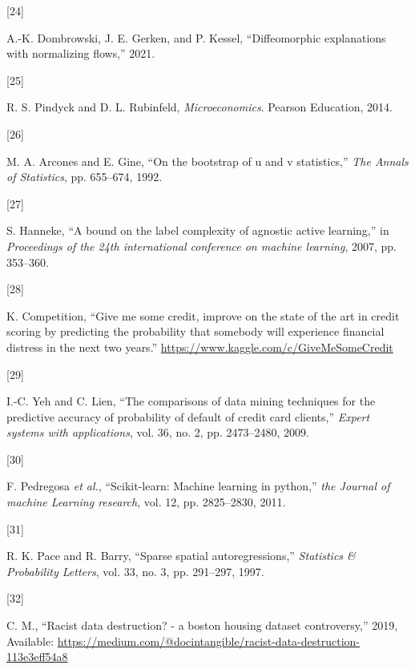 \documentclass[
  conference]{IEEEtran}
\newlength{\cslhangindent}
\newlength{\csllabelwidth}
\newlength{\cslentryspacingunit} %
\newenvironment{CSLReferences}[2] %
 {%
  \setlength{\parindent}{0pt}
  \ifodd #1
  \let\oldpar\par
  \def\par{\hangindent=\cslhangindent\oldpar}
  \fi
  \setlength{\parskip}{#2\cslentryspacingunit}
 }%
 {}
\newcommand{\CSLLeftMargin}[1]{\parbox[t]{\csllabelwidth}{#1}}
\newcommand{\CSLRightInline}[1]{\parbox[t]{\linewidth - \csllabelwidth}{#1}\break}
\begin{document}
\begin{CSLReferences}{0}{0}
\leavevmode{}%
\CSLLeftMargin{{[}24{]} }%
\CSLRightInline{A.-K. Dombrowski, J. E. Gerken, and P. Kessel,
{``Diffeomorphic explanations with normalizing flows,''} 2021.}

\leavevmode{}%
\CSLLeftMargin{{[}25{]} }%
\CSLRightInline{R. S. Pindyck and D. L. Rubinfeld,
\emph{Microeconomics}. Pearson Education, 2014.}

\leavevmode{}%
\CSLLeftMargin{{[}26{]} }%
\CSLRightInline{M. A. Arcones and E. Gine, {``On the bootstrap of u and
v statistics,''} \emph{The Annals of Statistics}, pp. 655--674, 1992.}

\leavevmode{}%
\CSLLeftMargin{{[}27{]} }%
\CSLRightInline{S. Hanneke, {``A bound on the label complexity of
agnostic active learning,''} in \emph{Proceedings of the 24th
international conference on machine learning}, 2007, pp. 353--360.}

\leavevmode{}%
\CSLLeftMargin{{[}28{]} }%
\CSLRightInline{K. Competition, {``Give me some credit, improve on the
state of the art in credit scoring by predicting the probability that
somebody will experience financial distress in the next two years.''}
\url{https://www.kaggle.com/c/GiveMeSomeCredit}}

\leavevmode{}%
\CSLLeftMargin{{[}29{]} }%
\CSLRightInline{I.-C. Yeh and C. Lien, {``The comparisons of data mining
techniques for the predictive accuracy of probability of default of
credit card clients,''} \emph{Expert systems with applications}, vol.
36, no. 2, pp. 2473--2480, 2009.}

\leavevmode{}%
\CSLLeftMargin{{[}30{]} }%
\CSLRightInline{F. Pedregosa \emph{et al.}, {``Scikit-learn: Machine
learning in python,''} \emph{the Journal of machine Learning research},
vol. 12, pp. 2825--2830, 2011.}

\leavevmode{}%
\CSLLeftMargin{{[}31{]} }%
\CSLRightInline{R. K. Pace and R. Barry, {``Sparse spatial
autoregressions,''} \emph{Statistics \& Probability Letters}, vol. 33,
no. 3, pp. 291--297, 1997.}

\leavevmode{}%
\CSLLeftMargin{{[}32{]} }%
\CSLRightInline{C. M., {``Racist data destruction? - a boston housing
dataset controversy,''} 2019, Available:
\url{https://medium.com/@docintangible/racist-data-destruction-113e3eff54a8}}


\end{CSLReferences}
\end{document}
